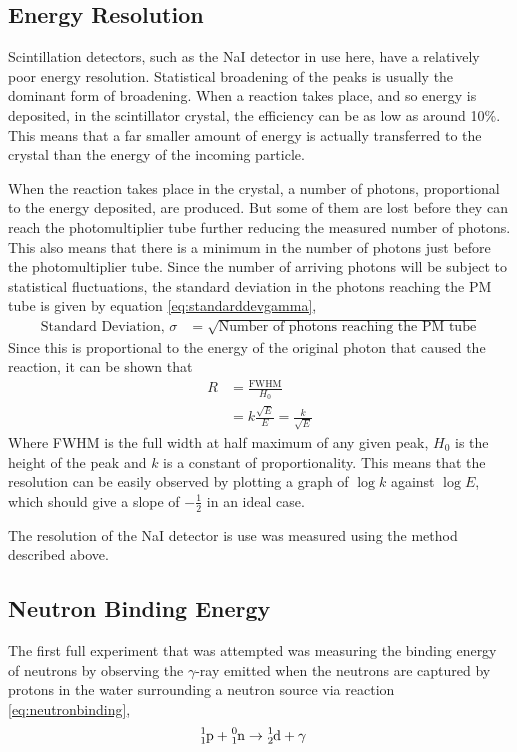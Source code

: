 \subsection{Energy Resolution} %
\label{sub:energy_resolution}
Scintillation detectors, such as the NaI detector in use here, have a relatively poor energy resolution. Statistical broadening of the peaks is usually the dominant form of broadening. When a reaction takes place, and so energy is deposited, in the scintillator crystal, the efficiency can be as low as around 10\%. This means that a far smaller amount of energy is actually transferred to the crystal than the energy of the incoming particle.

When the reaction takes place in the crystal, a number of photons, proportional to the energy deposited, are produced. But some of them are lost before they can reach the photomultiplier tube further reducing the measured number of photons. This also means that there is a minimum in the number of photons just before the photomultiplier tube. Since the number of arriving photons will be subject to statistical fluctuations, the standard deviation in the photons reaching the PM tube is given by equation \ref{eq:standarddevgamma},
\begin{align}
	\text{Standard Deviation, }\sigma &= \sqrt{\text{Number of photons reaching the PM tube}}\label{eq:standarddevgamma}
\end{align}
Since this is proportional to the energy of the original photon that caused the reaction, it can be shown that
\begin{align}
	R &= \frac{\text{FWHM}}{H_0} \\
	&= k\frac{\sqrt E}{E} = \frac{k}{\sqrt E}
\end{align}
Where FWHM is the full width at half maximum of any given peak, $H_0$ is the height of the peak and $k$ is a constant of proportionality. This means that the resolution can be easily observed by plotting a graph of $\log k$ against $\log E$, which should give a slope of $-\frac{1}{2}$ in an ideal case.

The resolution of the NaI detector is use was measured using the method described above.

\subsection{Neutron Binding Energy} %
\label{sub:neutron_binding_energy}
The first full experiment that was attempted was measuring the binding energy of neutrons by observing the $\gamma$-ray emitted when the neutrons are captured by protons in the water surrounding a neutron source via reaction \ref{eq:neutronbinding},
\begin{align}
	\cf{^{1}_{1}p} + \cf{^{0}_{1}n} &\rightarrow \cf{^{1}_{2}d} + \gamma \label{eq:neutronbinding}
\end{align}


